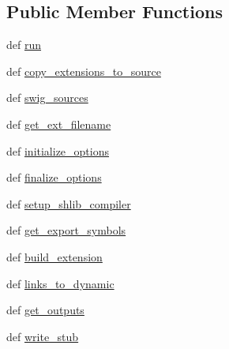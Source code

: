 \subsection*{Public Member Functions}
\begin{DoxyCompactItemize}
\item 
def \hyperlink{classsetuptools_1_1command_1_1build__ext_1_1build__ext_a32171bf3482cff68db6788ff5da1a6dd}{run}
\item 
def \hyperlink{classsetuptools_1_1command_1_1build__ext_1_1build__ext_a41952e5205c2617d67e805520d1860f9}{copy\+\_\+extensions\+\_\+to\+\_\+source}
\item 
def \hyperlink{classsetuptools_1_1command_1_1build__ext_1_1build__ext_ad867ae9c66968b3ae93793fb7b606415}{swig\+\_\+sources}
\item 
def \hyperlink{classsetuptools_1_1command_1_1build__ext_1_1build__ext_a4f1a68e4ddb9c0f5c2ab62eaf54d8b12}{get\+\_\+ext\+\_\+filename}
\item 
def \hyperlink{classsetuptools_1_1command_1_1build__ext_1_1build__ext_a053b237e6f8308ec847aa678d9753bb3}{initialize\+\_\+options}
\item 
def \hyperlink{classsetuptools_1_1command_1_1build__ext_1_1build__ext_aabba7d40bba0e5ae593053f35ca05a46}{finalize\+\_\+options}
\item 
def \hyperlink{classsetuptools_1_1command_1_1build__ext_1_1build__ext_a0edc19974c49507ca9060fe4ec8cee98}{setup\+\_\+shlib\+\_\+compiler}
\item 
def \hyperlink{classsetuptools_1_1command_1_1build__ext_1_1build__ext_a1bac66ad9745e88ed8c10324286b0459}{get\+\_\+export\+\_\+symbols}
\item 
def \hyperlink{classsetuptools_1_1command_1_1build__ext_1_1build__ext_aac9325efffe8164244f78b36fa1cb97f}{build\+\_\+extension}
\item 
def \hyperlink{classsetuptools_1_1command_1_1build__ext_1_1build__ext_aeabd001952c52f948c22330e2fbb6a4e}{links\+\_\+to\+\_\+dynamic}
\item 
def \hyperlink{classsetuptools_1_1command_1_1build__ext_1_1build__ext_afb5735fdc899f64aeb4d3f6a74fb213d}{get\+\_\+outputs}
\item 
def \hyperlink{classsetuptools_1_1command_1_1build__ext_1_1build__ext_a1130ab92e704815b276e0692fdbea88c}{write\+\_\+stub}
\end{DoxyCompactItemize}
